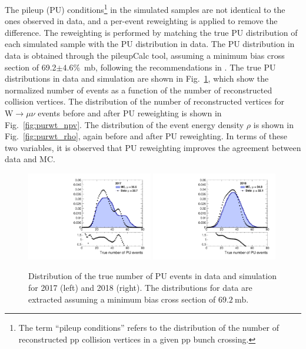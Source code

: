 The pileup (PU) conditions\footnote{The term ``pileup conditions'' refers to the distribution 
of the number of reconstructed pp collision vertices in a given pp bunch crossing.} 
in the simulated samples are not identical to the ones observed in data, and a per-event reweighting is applied to remove the difference.
The reweighting is performed by matching the true PU distribution of each simulated sample
with the PU distribution in data. The PU distribution in data is obtained through 
the pileupCalc tool, assuming a minimum bias cross section of 69.2$\pm 4.6\%$~mb, following the recommendations in \cite{pileup_twiki}.
The true PU distributions in data and simulation are shown in Fig.~\ref{fig:purwg_true}, which show the normalized number of events as a function of 
the number of reconstructed collision vertices. 
The distribution of the number of reconstructed vertices 
for $\textrm{W}\to \mu\nu$ events before and after PU reweighting is shown in Fig.~\ref{fig:purwt_npv}. The distribution of the event energy density 
$\rho$ is shown in Fig.~\ref{fig:purwt_rho}, again before and after PU reweighting. 
In terms of these two variables, it is observed that PU reweighting improves the agreement between data and MC.

\begin{figure}[ht!]
  \begin{center}
    \includegraphics[width=0.49\textwidth]{Pileup/pu_weights_2017.pdf}
    \includegraphics[width=0.49\textwidth]{Pileup/pu_weights_2018.pdf}
    \caption{
        Distribution of the true number of PU events in data and simulation for 2017 (left) and 2018 (right).
        The distributions for data are extracted assuming a minimum bias cross section of $69.2~\mathrm{mb}$.
    }
    \label{fig:purwg_true}
  \end{center}
\end{figure}

